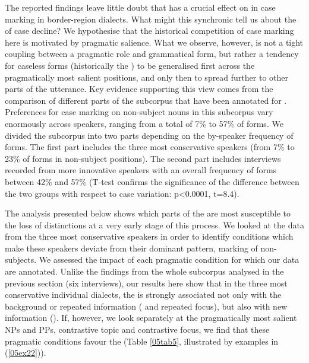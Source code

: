 \documentclass[output=paper,colorlinks,citecolor=brown]{langscibook}
\begin{document}
The reported findings leave little doubt that  has a crucial effect on  in case marking in  border-region dialects. What might this synchronic  tell us about the  of case decline? We hypothesise that the historical competition of case marking here is motivated by pragmatic salience. What we observe, however, is not a tight coupling between a pragmatic role and grammatical form, but rather a tendency for caseless forms (historically the ) to be generalised first across the pragmatically most salient positions, and only then to spread further to other parts of the utterance. Key evidence supporting this view comes from the comparison of different parts of the subcorpus that have been annotated for . Preferences for case marking on non-subject nouns in this subcorpus vary enormously across speakers, ranging from a total of 7\% to 57\% of  forms. We divided the subcorpus into two parts depending on the by-speaker frequency of  forms. The first part includes the three most conservative speakers (from 7\% to 23\% of  forms in non-subject positions). The second part includes interviews recorded from more innovative speakers with an overall frequency of  forms between 42\% and 57\% (T-test confirms the significance of the difference between the two groups with respect to case variation: p\textless0.0001, t=8.4).

The analysis presented below shows which parts of the  are most susceptible to the loss of  distinctions at a very early stage of this process. We looked at the data from the three most conservative speakers in order to identify conditions which make these speakers deviate from their dominant pattern,  marking of non-subjects. We assessed the impact of each pragmatic condition for which our data are annotated. Unlike the findings from the whole subcorpus analysed in the previous section (six interviews), our results here show that in the three most conservative individual dialects, the  is strongly associated not only with the background or repeated information ( and repeated focus), but also with new information (). If, however, we look separately at the pragmatically most salient NPs and PPs, contrastive topic and contrastive focus, we find that these pragmatic conditions favour the  (Table \ref{05tab5}, illustrated by examples in (\ref{05ex22})).
\end{document}
